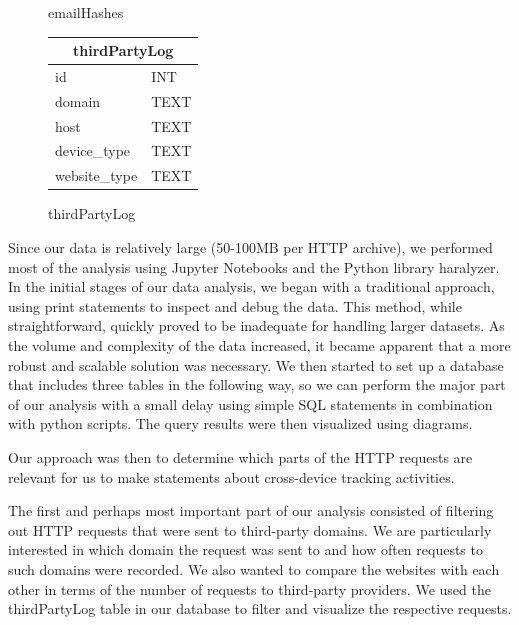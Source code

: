 \begin{figure}[ht]
\begin{subtable}[b]{0.3\textwidth}
        \caption{emailHashes}
    \end{subtable}
    \hfill
    \begin{subtable}[b]{0.3\textwidth}
        \centering
        \begin{tabular}{|l|l|}
            \hline
            \multicolumn{2}{|c|}{\textbf{thirdPartyLog}} \\
            \hline
            id           & INT \\
            domain       & TEXT \\
            host         & TEXT \\
            device\_type  & TEXT \\
            website\_type & TEXT \\
            \hline
        \end{tabular}
        \caption{thirdPartyLog}
    \end{subtable}
\end{figure}
\vspace{0.5cm}

Since our data is relatively large (50-100MB per HTTP archive), we performed most of the analysis using Jupyter Notebooks and the Python library haralyzer. In the initial stages of our data analysis, we began with a traditional approach, using print statements to inspect and debug the data. This method, while straightforward, quickly proved to be inadequate for handling larger datasets. As the volume and complexity of the data increased, it became apparent that a more robust and scalable solution was necessary. We then started to set up a database that includes three tables in the following way, so we can perform the major part of our analysis with a small delay using simple SQL statements in combination with python scripts. The query results were then visualized using diagrams.

Our approach was then to determine which parts of the HTTP requests are relevant for us to make statements about cross-device tracking activities.

The first and perhaps most important part of our analysis consisted of filtering out HTTP requests that were sent to third-party domains. We are particularly interested in which domain the request was sent to and how often requests to such domains were recorded. We also wanted to compare the websites with each other in terms of the number of requests to third-party providers. We used the thirdPartyLog table in our database to filter and visualize the respective requests.

